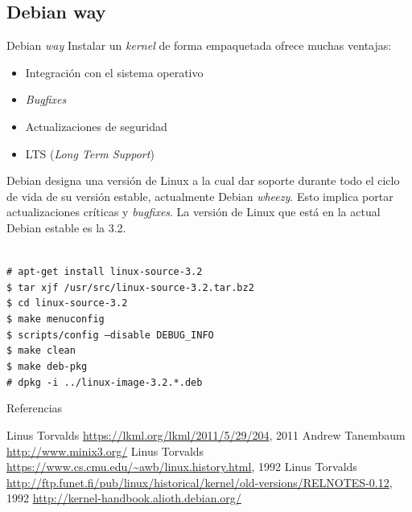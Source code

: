 \subsection{Debian way}
\begin{frame}{Debian \textit{way}}
Instalar un \textit{kernel} de forma empaquetada ofrece muchas ventajas:
\begin{itemize}
\item Integración con el sistema operativo
\item \textit{Bugfixes}
\item Actualizaciones de \alert{seguridad}
\item LTS (\textit{Long Term Support})
\end{itemize}

\vfill Debian designa una versión de Linux a la cual dar soporte durante
todo el ciclo de vida de su versión estable, actualmente Debian
\textit{wheezy}. Esto implica portar actualizaciones críticas y
\textit{bugfixes}. La versión de Linux que está en la actual Debian estable
es la 3.2.

{ \tiny
  \begin{block}{}
    \texttt{\\
\# apt-get install linux-source-3.2 \\
\$ tar xjf /usr/src/linux-source-3.2.tar.bz2 \\
\$ cd linux-source-3.2 \\
\$ make menuconfig \\
\$ scripts/config --disable DEBUG\_INFO \\
\$ make clean \\
\$ make deb-pkg \\
\# dpkg -i ../linux-image-3.2.*.deb
}
\end{block} }

\end{frame}

\begin{frame}{Referencias}
  \begin{thebibliography}{Foo Bar Baz, 1968}\footnotesize
   Linus Torvalds 
    \newblock \url{https://lkml.org/lkml/2011/5/29/204}, 2011
   Andrew Tanembaum  \newblock
    \url{http://www.minix3.org/}
   Linus Torvalds  \newblock
    \url{https://www.cs.cmu.edu/~awb/linux.history.html}, 1992
   Linus Torvalds  \newblock
    \url{http://ftp.funet.fi/pub/linux/historical/kernel/old-versions/RELNOTES-0.12}, 1992
   
    \newblock \url{http://kernel-handbook.alioth.debian.org/}
  \end{thebibliography}
\end{frame}

